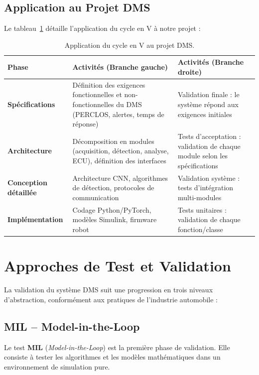 \documentclass[12pt,a4paper,twoside]{report}
\newcommand{\keyword}[1]{\textbf{\textcolor{stellantisblue}{#1}}}
\begin{document}
\subsection{Application au Projet DMS}

Le tableau~\ref{tab:cycle_v_dms} détaille l'application du cycle en V à notre projet :

\begin{table}[H]
\centering
\caption{Application du cycle en V au projet DMS.}
\label{tab:cycle_v_dms}
\renewcommand{\arraystretch}{1.4}
\begin{tabularx}{\textwidth}{|>{\bfseries\small}p{2.5cm}|X|X|}
\hline
\rowcolor{stellantisblue!15}
\textbf{Phase} & \textbf{Activités (Branche gauche)} & \textbf{Activités (Branche droite)} \\
\hline
Spécifications & Définition des exigences fonctionnelles et non-fonctionnelles du DMS (PERCLOS, alertes, temps de réponse) & Validation finale : le système répond aux exigences initiales \\
\hline
Architecture & Décomposition en modules (acquisition, détection, analyse, ECU), définition des interfaces & Tests d'acceptation : validation de chaque module selon les spécifications \\
\hline
Conception détaillée & Architecture CNN, algorithmes de détection, protocoles de communication & Validation système : tests d'intégration multi-modules \\
\hline
Implémentation & Codage Python/PyTorch, modèles Simulink, firmware robot & Tests unitaires : validation de chaque fonction/classe \\
\hline
\end{tabularx}
\end{table}

\section{Approches de Test et Validation}

La validation du système DMS suit une progression en trois niveaux d'abstraction, conformément aux pratiques de l'industrie automobile \cite{expleo2024} :

\subsection{MIL -- Model-in-the-Loop}

Le test \keyword{MIL} (\textit{Model-in-the-Loop}) est la première phase de validation. Elle consiste à tester les algorithmes et les modèles mathématiques dans un environnement de simulation pure.
\end{document}
